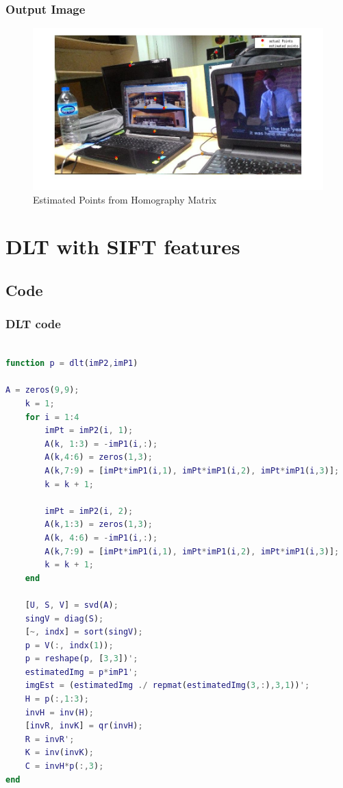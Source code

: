 \documentclass[12pt]{article}
\begin{document}
\subsubsection{Output Image}
\begin{figure}[htp]
\centering
\includegraphics[width=1.3\textwidth]{dltPt2manual.jpg}\hfill
\caption{Estimated Points from Homography Matrix}
\label{dltmanual}
\end{figure}
\clearpage




\section{DLT with SIFT features}

\subsection{Code} 
\subsubsection{DLT code}
\begin{lstlisting}[language=matlab]

function p = dlt(imP2,imP1)

A = zeros(9,9);
    k = 1;
    for i = 1:4
        imPt = imP2(i, 1);
        A(k, 1:3) = -imP1(i,:);
        A(k,4:6) = zeros(1,3);
        A(k,7:9) = [imPt*imP1(i,1), imPt*imP1(i,2), imPt*imP1(i,3)];
        k = k + 1;

        imPt = imP2(i, 2);
        A(k,1:3) = zeros(1,3);
        A(k, 4:6) = -imP1(i,:);
        A(k,7:9) = [imPt*imP1(i,1), imPt*imP1(i,2), imPt*imP1(i,3)];
        k = k + 1;
    end

    [U, S, V] = svd(A);
    singV = diag(S);
    [~, indx] = sort(singV);
    p = V(:, indx(1));
    p = reshape(p, [3,3])';
    estimatedImg = p*imP1';
    imgEst = (estimatedImg ./ repmat(estimatedImg(3,:),3,1))';
    H = p(:,1:3);
    invH = inv(H);
    [invR, invK] = qr(invH);
    R = invR';
    K = inv(invK);
    C = invH*p(:,3);
end
\end{lstlisting}
\end{document}
